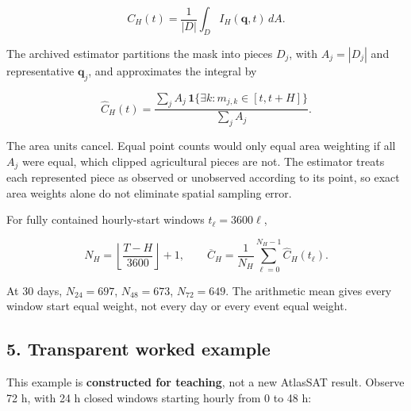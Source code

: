 \documentclass[10pt,a4paper]{article}
\numberwithin{equation}{section}
\begin{document}
\begin{equation}C_H(t)=\frac{1}{|D|}\int_D I_H(\mathbf q,t)\,dA.\label{eq:ch10-1}\end{equation}

\begin{sloppypar}The archived estimator partitions the mask into pieces \(D_j\), with \(A_j=|D_j|\) and representative \(\mathbf q_j\), and approximates the integral by\end{sloppypar}


\begin{equation}\widehat C_H(t)=
\frac{\sum_j A_j\,\mathbf 1\{\exists k:m_{j,k}\in[t,t+H]\}}
{\sum_j A_j}.\label{eq:weighted-coverage}\end{equation}

\begin{sloppypar}The area units cancel. Equal point counts would only equal area weighting if all \(A_j\) were equal, which clipped agricultural pieces are not. The estimator treats each represented piece as observed or unobserved according to its point, so exact area weights alone do not eliminate spatial sampling error.\end{sloppypar}


\begin{sloppypar}For fully contained hourly-start windows \(t_\ell=3600\ell\),\end{sloppypar}


\begin{equation}N_H=\left\lfloor\frac{T-H}{3600}\right\rfloor+1,\qquad
\overline C_H=\frac1{N_H}\sum_{\ell=0}^{N_H-1}\widehat C_H(t_\ell).\label{eq:ch10-3}\end{equation}

\begin{sloppypar}At 30 days, \(N_{24}=697\), \(N_{48}=673\), \(N_{72}=649\). The arithmetic mean gives every window start equal weight, not every day or every event equal weight.\end{sloppypar}


\subsection*{5. Transparent worked example}
\begin{sloppypar}This example is \textbf{constructed for teaching}, not a new AtlasSAT result. Observe 72 h, with 24 h closed windows starting hourly from 0 to 48 h:\end{sloppypar}
\end{document}
